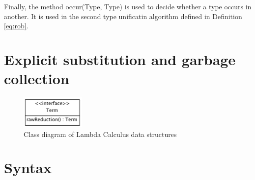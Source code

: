Finally, the method \textsf{occur(Type, Type)} is used to decide whether a type occurs in another. It is used in the second type unificatin algorithm defined in Definition \ref{eq:rob}.

\section{Explicit substitution and garbage collection}

\begin{figure}[ht]
\centering
\includegraphics[scale=0.7]{pics/TermRaw}
\caption{Class diagram of Lambda Calculus data structures}
\label{fig:termraw}
\end{figure}
\section{Syntax}